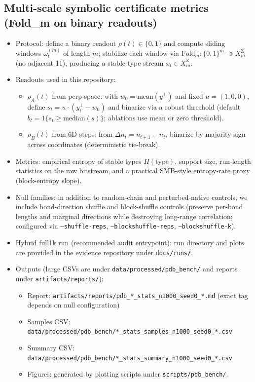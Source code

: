 \subsection*{Multi-scale symbolic certificate metrics (Fold\_m on binary readouts)}
\begin{itemize}
  \item Protocol: define a binary readout $\rho(t)\in\{0,1\}$ and compute sliding windows $\omega_t^{(m)}$ of length $m$; stabilize each window via $\mathrm{Fold}_m:\{0,1\}^m\twoheadrightarrow X_m^{\mathrm Z}$ (no adjacent 11), producing a stable-type stream $x_t\in X_m^{\mathrm Z}$.
  \item Readouts used in this repository:
  \begin{itemize}
    \item $\rho_A(t)$ from perp-space: with $w_0=\mathrm{mean}(y^\perp)$ and fixed $u=(1,0,0)$, define $s_t=u\cdot(y^\perp_t-w_0)$ and binarize via a robust threshold (default $b_t=1\{s_t\ge \mathrm{median}(s)\}$; ablations use mean or zero threshold).
    \item $\rho_B(t)$ from 6D steps: from $\Delta n_t=n_{t+1}-n_t$, binarize by majority sign across coordinates (deterministic tie-break).
  \end{itemize}
  \item Metrics: empirical entropy of stable types $H(\mathrm{type})$, support size, run-length statistics on the raw bitstream, and a practical SMB-style entropy-rate proxy (block-entropy slope).
  \item Null families: in addition to random-chain and perturbed-native controls, we include bond-direction shuffle and block-shuffle controls (preserve per-bond lengths and marginal directions while destroying long-range correlation; configured via \texttt{--shuffle-reps}, \texttt{--blockshuffle-reps}, \texttt{--blockshuffle-k}).
  \item Hybrid full1k run (recommended audit entrypoint): run directory and plots are provided in the evidence repository under \texttt{docs/runs/}.
  \item Outputs (large CSVs are under \texttt{data/processed/pdb\_bench/} and reports under \texttt{artifacts/reports/}):
  \begin{itemize}
    \item Report: \texttt{artifacts/reports/pdb\_*\_stats\_n1000\_seed0\_*.md} (exact tag depends on null configuration)
    \item Samples CSV: \texttt{data/processed/pdb\_bench/*\_stats\_samples\_n1000\_seed0\_*.csv}
    \item Summary CSV: \texttt{data/processed/pdb\_bench/*\_stats\_summary\_n1000\_seed0\_*.csv}
    \item Figures: generated by plotting scripts under \texttt{scripts/pdb\_bench/}.
  \end{itemize}
\end{itemize}

